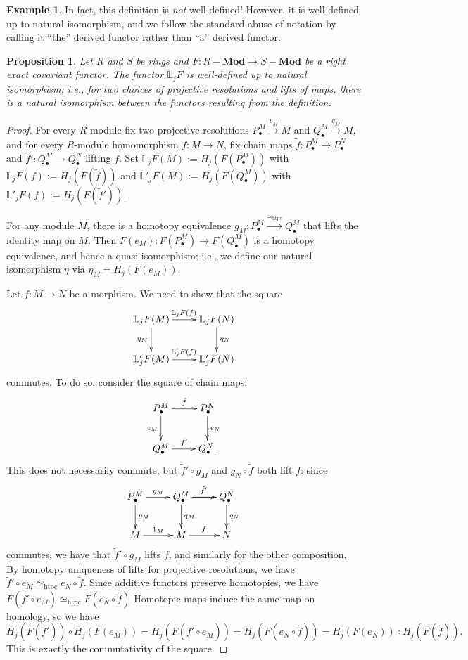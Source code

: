 \documentclass{amsart}[12pt]
\def\htpy{\simeq_{\mathrm{htpc}}}
\newcommand{\bL}{{\mathbb{L}}}
\numberwithin{equation}{section}
\theoremstyle{plain} %
\newtheorem{prop}[equation]{Proposition}
\theoremstyle{definition}
\newtheorem{ex}[equation]{Example}
\theoremstyle{remark}
\newcommand{\xra}[1]{\xrightarrow{#1}}
\newcommand{\Mod}[1]{#1-\mathbf{Mod}}
\begin{document}
\begin{ex}
In fact, this definition is \emph{not} well defined! However, it is well-defined up to natural isomorphism, and we follow the standard abuse of notation by calling it ``the'' derived functor rather than ``a'' derived functor.

\begin{prop}
Let $R$ and $S$ be rings and $F: \Mod{R} \to \Mod{S}$ be a right exact covariant functor. 
The functor $\bL_j F$ is well-defined up to natural isomorphism; i.e., for two choices of projective resolutions and lifts of maps, there is a natural isomorphism between the functors resulting from the definition.
\end{prop}

\begin{proof}
For every $R$-module fix two projective resolutions $P_\bullet^M \xra{p_M} M$ and $Q_\bullet^M \xra{q_M} M$, and for every $R$-module homomorphism $f: M \to N$, fix chain maps $\tilde{f}: P_\bullet^M \to P_\bullet^N$ and $\tilde{f}': Q_\bullet^M \to Q_\bullet^N$ lifting $f$. Set $\bL_j F(M) := H_j(F(P^M_\bullet))$ with $\bL_j F(f) := H_j(F(\tilde{f}))$ and $\bL'_j F(M) := H_j(F(Q^M_\bullet))$ with $\bL'_j F(f) := H_j(F(\tilde{f}'))$.



For any module $M$, there is a homotopy equivalence $g_M: P^M_\bullet \xra{\htpy} Q^M_\bullet$ that lifts the identity map on $M$. Then $F(e_M): F(P^M_\bullet) \to  F(Q^M_\bullet)$ is a homotopy equivalence, and hence a quasi-isomorphism; i.e.,  we define our natural isomorphism $\eta$ via $\eta_M=H_j(F(e_M))$.

Let $f:M\to N$ be a morphism. We need to show that the square
\[ \xymatrix{ \bL_j F(M) \ar[r]^{\bL_j F(f)} \ar[d]_{\eta_M} & \bL_j F(N) \ar[d]^{\eta_N} \\ \bL'_j F(M) \ar[r]^{\bL'_j F(f)} & \bL'_j F(N)}\]
commutes. To do so, consider the square of chain maps:
\[ \xymatrix{ P_\bullet^M \ar[r]^{\tilde{f}} \ar[d]_{e_M} & P_\bullet^N \ar[d]^{e_N} \\ Q_\bullet^M \ar[r]^{\tilde{f}'} & Q_\bullet^N.}\]
This does not necessarily commute, but $\tilde{f}' \circ g_M$ and $g_N \circ \tilde{f}$ both lift $f$: since
\[ \xymatrix{ P_\bullet^M \ar[r]^{g_M} \ar[d]^{p_M}& Q_\bullet^M \ar[r]^{\tilde{f}'}\ar[d]^{q_M} \ar[r]& Q_\bullet^N \ar[d]^{q_N} \\ M \ar[r]^{1_M} & M \ar[r]^{f} & N}\]
commutes, we have that $\tilde{f}' \circ g_M$ lifts $f$, and similarly for the other composition. By homotopy uniqueness of lifts for projective resolutions, we have $\tilde{f}' \circ e_M \htpy e_N \circ \tilde{f}$. Since additive functors preserve homotopies, we have 
$F(\tilde{f}' \circ e_M) \htpy F(e_N \circ \tilde{f})$
Homotopic maps induce the same map on homology, so we have
\[H_j(F(\tilde{f}')) \circ H_j(F(e_M)) = H_j(F(\tilde{f}' \circ e_M)) = H_j(F(e_N \circ \tilde{f})) = H_j(F(e_N)) \circ H_j(F(\tilde{f})).\]
This is exactly the commutativity of the square.
\end{proof}


\end{ex}
\end{document}
